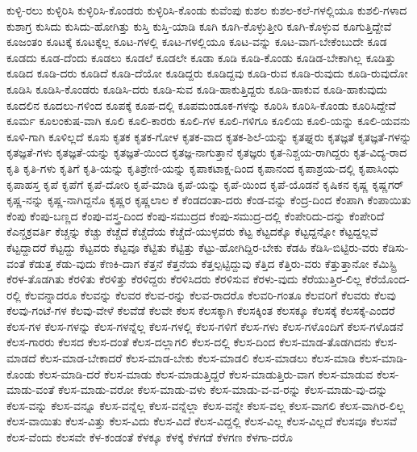 {ಕುಳ್ಳಿ-ರಲು
ಕುಳ್ಳಿರಿಸಿ
ಕುಳ್ಳಿರಿಸಿ-ಕೊಂಡರು
ಕುಳ್ಳಿರಿಸಿ-ಕೊಂಡು
ಕುವೆಂಪು
ಕುಶಲ
ಕುಶಲ-ಕಲೆ-ಗಳಲ್ಲಿಯೂ
ಕುಶಲಿ-ಗಳಾದ
ಕುಶಾಗ್ರ
ಕುಸಿದು
ಕುಸಿದು-ಹೋಗಿತ್ತು
ಕುಸ್ತಿ
ಕುಸ್ತಿ-ಯಾಡಿ
ಕೂಗಿ
ಕೂಗಿ-ಕೊಳ್ಳುತ್ತೀರಿ
ಕೂಗಿ-ಕೊಳ್ಳುವ
ಕೂಗುತ್ತಿದ್ದೇವೆ
ಕೂಜಂತಂ
ಕೂಟಕ್ಕೆ
ಕೂಟಕ್ಕೆಲ್ಲ
ಕೂಟ-ಗಳಲ್ಲಿ
ಕೂಟ-ಗಳಲ್ಲಿಯೂ
ಕೂಟ-ವನ್ನು
ಕೂಟ-ವಾಗ-ಬೇಕೆಂಬುದೇ
ಕೂಡ
ಕೂಡದು
ಕೂಡ-ದೆಂದು
ಕೂಡಲು
ಕೂಡಲೆ
ಕೂಡಲೇ
ಕೂಡಾ
ಕೂಡಿ
ಕೂಡಿ-ಕೊಂಡು
ಕೂಡಿಡ-ಬೇಕಾಗಿಲ್ಲ
ಕೂಡಿತ್ತು
ಕೂಡಿದ
ಕೂಡಿ-ದರು
ಕೂಡಿದೆ
ಕೂಡಿ-ದೆಯೋ
ಕೂಡಿದ್ದರು
ಕೂಡಿದ್ದವು
ಕೂಡಿ-ರುವ
ಕೂಡಿ-ರುವುದು
ಕೂಡಿ-ರುವುದೋ
ಕೂಡಿಸಿ
ಕೂಡಿಸಿ-ಕೊಂಡರು
ಕೂಡಿಸಿ-ದರು
ಕೂಡಿ-ಸುವ
ಕೂಡಿ-ಹಾಕುತ್ತಿದ್ದರು
ಕೂಡಿ-ಹಾಕುವ
ಕೂಡಿ-ಹಾಕುವುದು
ಕೂದಲಿನ
ಕೂದಲು-ಗಳಿಂದ
ಕೂಪಕ್ಕೆ
ಕೂಪ-ದಲ್ಲಿ
ಕೂಪಮಂಡೂಕ-ಗಳನ್ನು
ಕೂರಿಸಿ
ಕೂರಿಸಿ-ಕೊಂಡು
ಕೂರಿಸಿದ್ದೇವೆ
ಕೂರ್ಮ
ಕೂಲಂಕುಷ-ವಾಗಿ
ಕೂಲಿ
ಕೂಲಿ-ಕಾರರು
ಕೂಲಿ-ಗಳ
ಕೂಲಿ-ಗಳಿಗೂ
ಕೂಲಿಯ
ಕೂಲಿ-ಯನ್ನು
ಕೂಲಿ-ಯವನು
ಕೂಳಿ-ಗಾಗಿ
ಕೂಳಿಲ್ಲದೆ
ಕೂಸು
ಕೃತಕ
ಕೃತಕ-ಗೋಳ
ಕೃತಕ-ವಾದ
ಕೃತಕ-ಶಿಲೆ-ಯನ್ನು
ಕೃತಘ್ನರು
ಕೃತಜ್ಞತೆ
ಕೃತಜ್ಞತೆ-ಗಳನ್ನು
ಕೃತಜ್ಞತೆ-ಗಳು
ಕೃತಜ್ಞತೆ-ಯನ್ನು
ಕೃತಜ್ಞತೆ-ಯಿಂದ
ಕೃತಜ್ಞ-ನಾಗುತ್ತಾನೆ
ಕೃತಜ್ಞರು
ಕೃತ-ನಿಶ್ಚಯ-ರಾಗಿದ್ದರು
ಕೃತ-ವಿದ್ಯ-ರಾದ
ಕೃತಿ
ಕೃತಿ-ಗಳು
ಕೃತಿಗೆ
ಕೃತಿ-ಯನ್ನು
ಕೃತಿಶ್ರೇಣಿ-ಯನ್ನು
ಕೃಪಾಕಟಾಕ್ಷ-ದಿಂದ
ಕೃಪಾನಂದ
ಕೃಪಾಶ್ರಯ-ದಲ್ಲಿ
ಕೃಪಾಸಿಂಧು
ಕೃಪಾಹಸ್ತ
ಕೃಪೆ
ಕೃಪೆಗೆ
ಕೃಪೆ-ದೋರಿ
ಕೃಪೆ-ಮಾಡಿ
ಕೃಪೆ-ಯನ್ನು
ಕೃಪೆ-ಯಿಂದ
ಕೃಪೆ-ಯೊಡನೆ
ಕೃಷಿಕನ
ಕೃಷ್ಣ
ಕೃಷ್ಣಗರ್
ಕೃಷ್ಣ-ನನ್ನು
ಕೃಷ್ಣ-ನಾಗಿದ್ದನೊ
ಕೃಷ್ಣರ
ಕೃಷ್ಣಲಾಲ
ಕೆ
ಕೆಂಡದಂತಾ-ದರು
ಕೆಂಡ-ವನ್ನು
ಕೆಂದ್ರ-ದಿಂದ
ಕೆಂಪಾಗಿ
ಕೆಂಪಾಯಿತು
ಕೆಂಪು
ಕೆಂಪು-ಬಣ್ಣದ
ಕೆಂಪು-ವಸ್ತ್ರ-ದಿಂದ
ಕೆಂಪು-ಸಮುದ್ರದ
ಕೆಂಪು-ಸಮುದ್ರ-ದಲ್ಲಿ
ಕೆಂಪೇರಿದು-ದನ್ನು
ಕೆಂಪೇರಿದೆ
ಕೆಎನ್ಚಕ್ರವರ್ತಿ
ಕೆಚ್ಚನ್ನು
ಕೆಚ್ಚು
ಕೆಚ್ಚೆದೆ
ಕೆಚ್ಚೆದೆಯ
ಕೆಚ್ಚೆದೆ-ಯುಳ್ಳವರು
ಕೆಟ್ಟ
ಕೆಟ್ಟದಕ್ಕೊ
ಕೆಟ್ಟದ್ದನ್ನೋ
ಕೆಟ್ಟದ್ದಲ್ಲವೆ
ಕೆಟ್ಟದ್ದಾದರೆ
ಕೆಟ್ಟದ್ದು
ಕೆಟ್ಟವರು
ಕೆಟ್ಟವೂ
ಕೆಟ್ಟಿತು
ಕೆಟ್ಟಿತ್ತು
ಕೆಟ್ಟು-ಹೋಗಿದ್ದಿರ-ಬೇಕು
ಕೆಡಹಿ
ಕೆಡಿಸಿ-ಬಿಟ್ಟಿರು-ವರು
ಕೆಡಿಸು-ವಂತೆ
ಕೆಡುತ್ತ
ಕೆಡು-ವುದು
ಕೆಣಕಿ-ದಾಗ
ಕೆತ್ತನೆ
ಕೆತ್ತನೆಯ
ಕೆತ್ತಲ್ಪಟ್ಟಿದ್ದುವು
ಕೆತ್ತಿದ
ಕೆತ್ತಿರು-ವರು
ಕೆತ್ತುತ್ತಾನೋ
ಕೆಮಿಸ್ಟ್ರಿ
ಕೆರಳ-ತೊಡಗಿತು
ಕೆರಳಿತು
ಕೆರಳಿತ್ತು
ಕೆರಳಿದ್ದರು
ಕೆರಳಿಸಿದರು
ಕೆರಳಿಸುವ
ಕೆರಳು-ವುದು
ಕೆರೆಯುತ್ತಿರ-ಲಿಲ್ಲ
ಕೆರೆಯೊಂದ-ರಲ್ಲಿ
ಕೆಲವನ್ನಾದರೂ
ಕೆಲವನ್ನು
ಕೆಲವರ
ಕೆಲವ-ರನ್ನು
ಕೆಲವ-ರಾದರೊ
ಕೆಲವರಿ-ಗಂತೂ
ಕೆಲವರಿಗೆ
ಕೆಲವರು
ಕೆಲವು
ಕೆಲವು-ಗಂಟೆ-ಗಳ
ಕೆಲವು-ವೇಳೆ
ಕೆಲವೆಡೆ
ಕೆಲವೇ
ಕೆಲಸ
ಕೆಲಸಕ್ಕಾಗಿ
ಕೆಲಸಕ್ಕಿಂತ
ಕೆಲಸಕ್ಕೂ
ಕೆಲಸಕ್ಕೆ
ಕೆಲಸಕ್ಕೆ-ಎಂದರೆ
ಕೆಲಸ-ಗಳ
ಕೆಲಸ-ಗಳನ್ನು
ಕೆಲಸ-ಗಳನ್ನೆಲ್ಲ
ಕೆಲಸ-ಗಳಲ್ಲಿ
ಕೆಲಸ-ಗಳಿಗೆ
ಕೆಲಸ-ಗಳು
ಕೆಲಸ-ಗಳೊಂದಿಗೆ
ಕೆಲಸ-ಗಳೊಡನೆ
ಕೆಲಸ-ಗಾರರು
ಕೆಲಸದ
ಕೆಲಸ-ದಂತೆ
ಕೆಲಸ-ದಲ್ಲಾಗಲಿ
ಕೆಲಸ-ದಲ್ಲಿ
ಕೆಲಸ-ದಿಂದ
ಕೆಲಸ-ಮಾಡ-ತೊಡಗಿದನು
ಕೆಲಸ-ಮಾಡದೆ
ಕೆಲಸ-ಮಾಡ-ಬೇಕಾದರೆ
ಕೆಲಸ-ಮಾಡ-ಬೇಕು
ಕೆಲಸ-ಮಾಡಲಿ
ಕೆಲಸ-ಮಾಡಲು
ಕೆಲಸ-ಮಾಡಿ
ಕೆಲಸ-ಮಾಡಿ-ಕೊಂಡು
ಕೆಲಸ-ಮಾಡಿ-ದರೆ
ಕೆಲಸ-ಮಾಡು
ಕೆಲಸ-ಮಾಡುತ್ತಿದ್ದರೆ
ಕೆಲಸ-ಮಾಡುತ್ತಿರು-ವಾಗ
ಕೆಲಸ-ಮಾಡುವ
ಕೆಲಸ-ಮಾಡು-ವಂತೆ
ಕೆಲಸ-ಮಾಡು-ವರೋ
ಕೆಲಸ-ಮಾಡು-ವಳು
ಕೆಲಸ-ಮಾಡು-ವ-ವ-ರನ್ನು
ಕೆಲಸ-ಮಾಡು-ವು-ದನ್ನು
ಕೆಲಸ-ವನ್ನು
ಕೆಲಸ-ವನ್ನೂ
ಕೆಲಸ-ವನ್ನೆಲ್ಲ
ಕೆಲಸ-ವನ್ನೆಲ್ಲಾ
ಕೆಲಸ-ವನ್ನೇ
ಕೆಲಸ-ವಲ್ಲ
ಕೆಲಸ-ವಾಗಲಿ
ಕೆಲಸ-ವಾಗಿರ-ಲಿಲ್ಲ
ಕೆಲಸ-ವಾಯಿತು
ಕೆಲಸ-ವಿತ್ತು
ಕೆಲಸ-ವಿದು
ಕೆಲಸ-ವಿದೆ
ಕೆಲಸ-ವಿದ್ದಲ್ಲಿ
ಕೆಲಸ-ವಿಲ್ಲ
ಕೆಲಸ-ವಿಲ್ಲದೆ
ಕೆಲಸವೂ
ಕೆಲಸವೆ
ಕೆಲಸ-ವೆಂದು
ಕೆಲಸವೇ
ಕೆಳ-ಕಂಡಂತೆ
ಕೆಳಕ್ಕೂ
ಕೆಳಕ್ಕೆ
ಕೆಳಗಡೆ
ಕೆಳಗಣ
ಕೆಳಗಾ-ದರೊ
}
